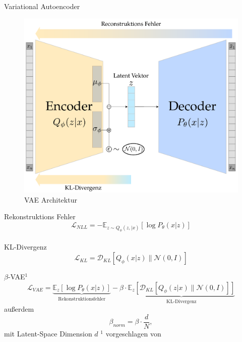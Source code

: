 \documentclass[10pt, compress]{beamer}
\begin{document}
\begin{frame}{Variational Autoencoder}
  \begin{minipage}[c]{.5\textwidth}
    \begin{figure}[hbt]
      \includegraphics[width=\textwidth]{gfx/literature/VAE Architecture}
      \caption{VAE Architektur}
    \end{figure}
  \end{minipage}
  \hfill
  \begin{minipage}[c]{.45\textwidth}
    Rekonstruktions Fehler
    \begin{equation*}
      \mathcal{L}_{NLL} = - \mathbb{E}_{z \sim Q_\phi(z, \vert x)} \left[ \log P_\theta(x \vert z) \right]
    \end{equation*}
    \\
    KL-Divergenz
    \begin{equation*}
      \mathcal{L}_{KL} = \mathcal{D}_{KL}\left[ Q_\phi(x \vert z) \| \mathcal{N}(0, I) \right]
    \end{equation*}
  \end{minipage}
\end{frame}

\begin{frame}{$\beta$-VAE$^1$}
  \begin{equation}
    \mathcal{L}_{VAE} = \underbrace{\mathbb{E}_z \left[ \log P_\theta(x \vert z)\right]}_{\text{Rekonstruktionsfehler}} - \beta \cdot \underbrace{\mathbb{E}_z \left[ \mathcal{D}_{KL}\left[ Q_\phi(z \vert x) \| \mathcal{N}(0, I) \right] \right]}_{\text{KL-Divergenz}}
  \end{equation}
  \vfill
  außerdem
  \begin{equation}
    \beta_{norm} = \beta \cdot \frac{d}{N},
  \end{equation}
  mit Latent-Space Dimension $d$
  \vfill
{\tiny $^1$ vorgeschlagen von \cite{Higgins2017}}
\end{frame}
\end{document}
